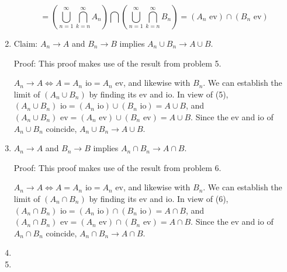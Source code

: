 \documentclass[12pt]{article}
\begin{document}
\begin{enumerate}
$$ = \left( \bigcup^\infty_{n=1}\bigcap^\infty_{k=n}A_n \right) \bigcap \left( \bigcup^\infty_{n=1} \bigcap^\infty_{k=n}B_n \right) = (A_n \mbox{ ev})\cap (B_n\mbox{ ev}) $$

\item Claim: $A_n \to A$ and $B_n \to B$ implies $A_n \cup B_n \to A \cup B$.

Proof: This proof makes use of the result from problem 5.

$A_n \to A \Leftrightarrow A = A_n \mbox{ io} = A_n \mbox{ ev}$, and likewise with $B_n$. We can establish the limit of $(A_n \cup B_n)$ by finding its ev and io. In view of (5), $(A_n \cup B_n)\mbox{ io} = (A_n\mbox{ io}) \cup (B_n\mbox{ io})=A \cup B$, and $(A_n \cup B_n)\mbox{ ev} = (A_n\mbox{ ev}) \cup (B_n\mbox{ ev})=A \cup B$. Since the ev and io of $A_n \cup B_n$ coincide, $A_n \cup B_n \to A \cup B$.

\item $A_n \to A$ and $B_n \to B$ implies $A_n \cap B_n \to A \cap B$.

Proof: This proof makes use of the result from problem 6.

$A_n \to A \Leftrightarrow A = A_n \mbox{ io} = A_n \mbox{ ev}$, and likewise with $B_n$. We can establish the limit of $(A_n \cap B_n)$ by finding its ev and io. In view of (6), $(A_n \cap B_n)\mbox{ io} = (A_n\mbox{ io}) \cap (B_n\mbox{ io})=A \cap B$, and $(A_n \cap B_n)\mbox{ ev} = (A_n\mbox{ ev}) \cap (B_n\mbox{ ev})=A \cap B$. Since the ev and io of $A_n \cap B_n$ coincide, $A_n \cap B_n \to A \cap B$.

\item

\item

\end{enumerate}
\end{document}
